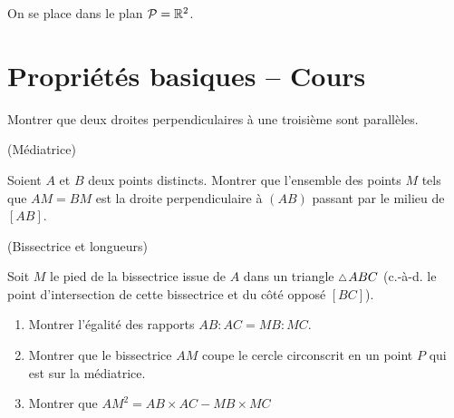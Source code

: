 \documentclass[a4paper,11pt,reqno]{amsart}
\begin{document}

\begin{convention}
  On se place dans le plan $\mathcal{P}=\mathbb{R}^2$.
\end{convention}

\section{Propriétés basiques -- Cours}


\begin{exo}

  Montrer que deux droites perpendiculaires à une troisième sont parallèles.
\end{exo}

\begin{exo} (Médiatrice)

  Soient $A$ et $B$ deux points distincts. Montrer que l'ensemble des points $M$ tels que $AM=BM$ est la droite perpendiculaire à $(AB)$ passant par le milieu de $[AB]$.
\end{exo}

\begin{exo} (Bissectrice et longueurs)

  Soit $M$ le pied de la bissectrice issue de $A$ dans un triangle $\tri ABC$ (c.-à-d. le point d'intersection de cette bissectrice et du côté opposé $[BC]$).
  \begin{enumerate}
    \item Montrer l'égalité des rapports $AB:AC=MB:MC$.
    \item Montrer que le bissectrice $AM$ coupe le cercle circonscrit en un point $P$ qui est sur la médiatrice.
    \item Montrer que $AM^{2} = AB \times AC - MB \times MC$
  \end{enumerate}
\end{exo}
\end{document}
